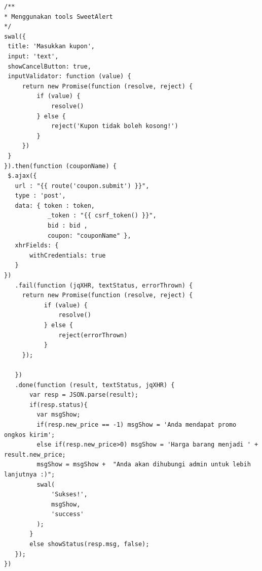 \begin{lstlisting}[label=cdjq.04-06x,style=htmlcssjs,caption=Implementasi \textit{View Logic} Memasukkan Kupon]
/** 
* Menggunakan tools SweetAlert
*/
swal({
 title: 'Masukkan kupon',
 input: 'text',
 showCancelButton: true,
 inputValidator: function (value) {
     return new Promise(function (resolve, reject) {
         if (value) {
             resolve()
         } else {
             reject('Kupon tidak boleh kosong!')
         }
     })
 }
}).then(function (couponName) {
 $.ajax({
   url : "{{ route('coupon.submit') }}",
   type : 'post',
   data: { token : token,
            _token : "{{ csrf_token() }}",
            bid : bid ,
            coupon: "couponName" },
   xhrFields: {
       withCredentials: true
   }
})
   .fail(function (jqXHR, textStatus, errorThrown) {
     return new Promise(function (resolve, reject) {
	       if (value) {
	           resolve()
	       } else {
	           reject(errorThrown)
	       }
     });

   })
   .done(function (result, textStatus, jqXHR) {
       var resp = JSON.parse(result);
       if(resp.status){
         var msgShow;
         if(resp.new_price == -1) msgShow = 'Anda mendapat promo ongkos kirim';
         else if(resp.new_price>0) msgShow = 'Harga barang menjadi ' + result.new_price;
         msgShow = msgShow +  "Anda akan dihubungi admin untuk lebih lanjutnya :)";
         swal(
             'Sukses!',
             msgShow,
             'success'
         );
       }
       else showStatus(resp.msg, false);
   });
})
\end{lstlisting}


